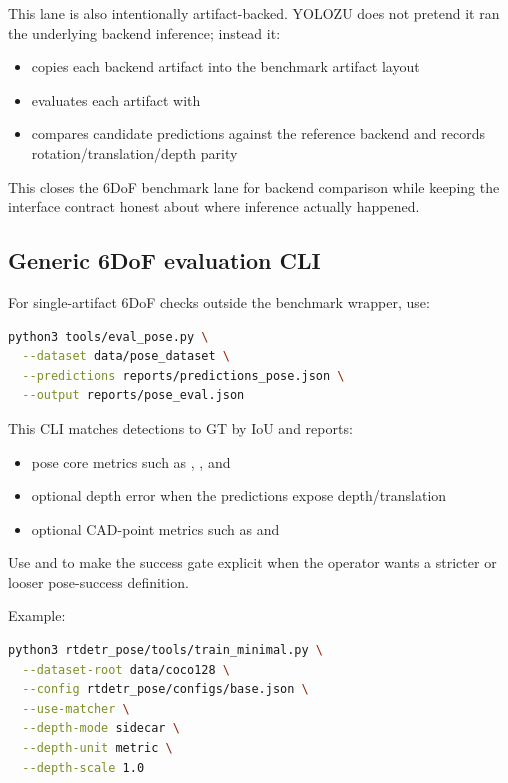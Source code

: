 This lane is also intentionally artifact-backed. YOLOZU does not pretend it
ran the underlying backend inference; instead it:
\begin{itemize}
  \item copies each backend  artifact into the benchmark artifact layout
  \item evaluates each artifact with 
  \item compares candidate predictions against the reference backend and records rotation/translation/depth parity
\end{itemize}

This closes the 6DoF benchmark lane for backend comparison while keeping the
interface contract honest about where inference actually happened.

\subsection{Generic 6DoF evaluation CLI}
For single-artifact 6DoF checks outside the benchmark wrapper, use:
\begin{lstlisting}[language=bash]
python3 tools/eval_pose.py \
  --dataset data/pose_dataset \
  --predictions reports/predictions_pose.json \
  --output reports/pose_eval.json
\end{lstlisting}

This CLI matches detections to GT by IoU and reports:
\begin{itemize}
  \item pose core metrics such as , , and 
  \item optional depth error when the predictions expose depth/translation
  \item optional CAD-point metrics such as  and 
\end{itemize}

Use \cmd{--success-rot-deg} and \cmd{--success-trans} to make the success gate
explicit when the operator wants a stricter or looser pose-success definition.

Example:
\begin{lstlisting}[language=bash]
python3 rtdetr_pose/tools/train_minimal.py \
  --dataset-root data/coco128 \
  --config rtdetr_pose/configs/base.json \
  --use-matcher \
  --depth-mode sidecar \
  --depth-unit metric \
  --depth-scale 1.0
\end{lstlisting}


